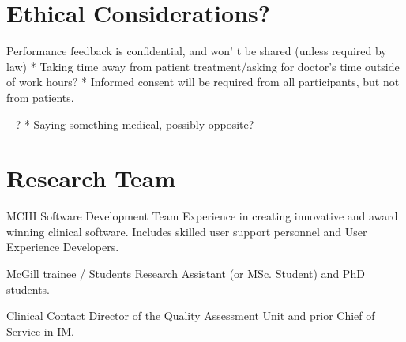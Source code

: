 \section{Ethical Considerations?} %
Performance feedback is confidential, and won’ t be shared (unless required by law)
* Taking time away from patient treatment/asking for doctor's time outside of work hours?
* Informed consent will be required from all participants, but not from patients.

-- ?
* Saying something medical, possibly opposite?

\section{Research Team}
MCHI Software Development Team
	Experience in creating innovative and award winning clinical software.
	Includes skilled user support personnel and User Experience Developers.

McGill trainee / Students
	Research Assistant (or MSc. Student) and PhD students.

Clinical Contact
	Director of the Quality Assessment Unit and prior Chief of Service in IM.
